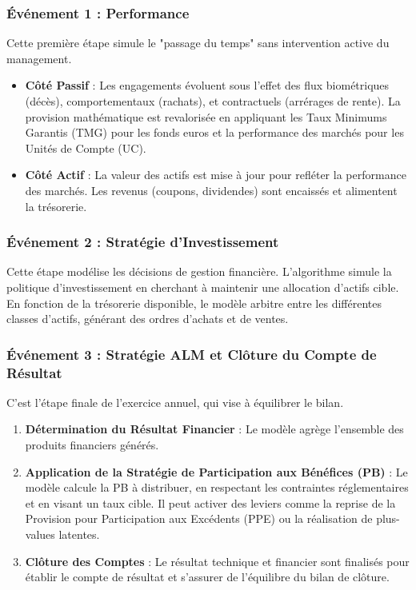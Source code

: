 \subsubsection{Événement 1 : Performance}
Cette première étape simule le "passage du temps" sans intervention active du management.
\begin{itemize}
\item \textbf{Côté Passif} : Les engagements évoluent sous l'effet des flux biométriques (décès), comportementaux (rachats), et contractuels (arrérages de rente). La provision mathématique est revalorisée en appliquant les Taux Minimums Garantis (TMG) pour les fonds euros et la performance des marchés pour les Unités de Compte (UC).
\item \textbf{Côté Actif} : La valeur des actifs est mise à jour pour refléter la performance des marchés. Les revenus (coupons, dividendes) sont encaissés et alimentent la trésorerie.
\end{itemize}

\subsubsection{Événement 2 : Stratégie d'Investissement}
Cette étape modélise les décisions de gestion financière. L'algorithme simule la politique d'investissement en cherchant à maintenir une allocation d'actifs cible. En fonction de la trésorerie disponible, le modèle arbitre entre les différentes classes d'actifs, générant des ordres d'achats et de ventes.

\subsubsection{Événement 3 : Stratégie ALM et Clôture du Compte de Résultat}
C'est l'étape finale de l'exercice annuel, qui vise à équilibrer le bilan.
\begin{enumerate}
\item \textbf{Détermination du Résultat Financier} : Le modèle agrège l'ensemble des produits financiers générés.
\item \textbf{Application de la Stratégie de Participation aux Bénéfices (PB)} : Le modèle calcule la PB à distribuer, en respectant les contraintes réglementaires et en visant un taux cible. Il peut activer des leviers comme la reprise de la Provision pour Participation aux Excédents (PPE) ou la réalisation de plus-values latentes.
\item \textbf{Clôture des Comptes} : Le résultat technique et financier sont finalisés pour établir le compte de résultat et s'assurer de l'équilibre du bilan de clôture.
\end{enumerate}

